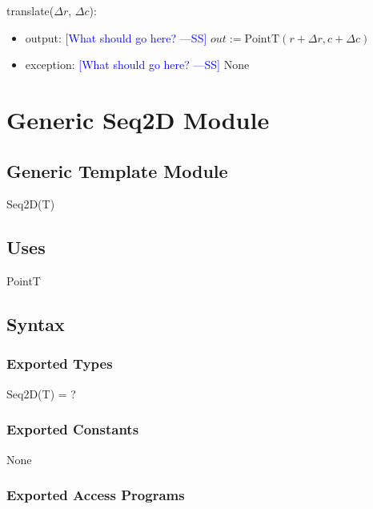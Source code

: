 \documentclass[12pt]{article}
\newcommand{\authornote}[3]{\textcolor{#1}{[#3 ---#2]}}
\newcommand{\authornote}[3]{}
\newcommand{\wss}[1]{\authornote{blue}{SS}{#1}}
\begin{document}
\noindent translate($\Delta r$, $\Delta c$):
\begin{itemize}
\item output: \wss{What should go here?}  $out :=\mbox{PointT}(r + \Delta r, c + \Delta c)$
\item exception: \wss{What should go here?}  None
\end{itemize}

\newpage

\section* {Generic Seq2D Module}

\subsection* {Generic Template Module}

Seq2D(T)

\subsection* {Uses}

PointT

\subsection* {Syntax}

\subsubsection* {Exported Types}

Seq2D(T) = ?

\subsubsection* {Exported Constants}

None

\subsubsection* {Exported Access Programs}
\end{document}
